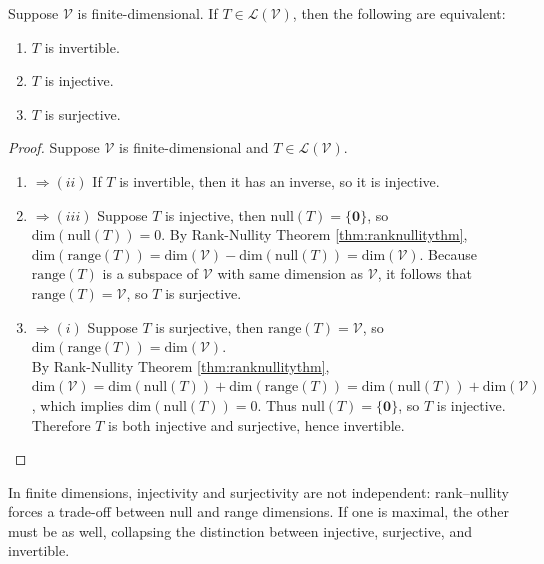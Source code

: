 \begin{theorem} Suppose $\mathcal{V}$ is finite-dimensional. If $T \in \mathcal{L}(\mathcal{V})$, then the following are equivalent:
\begin{enumerate}[label=\roman*.]
\setlength{\itemsep}{0pt}
\item $T$ is invertible.
\item $T$ is injective.
\item $T$ is surjective.
\end{enumerate}
\begin{proof} Suppose $\mathcal{V}$ is finite-dimensional and $T \in \mathcal{L}(\mathcal{V})$.
\begin{enumerate}[label=\roman*.]
\setlength{\itemsep}{0pt}
\item[$(i)$]$\Rightarrow (ii)$ If $T$ is invertible, then it has an inverse, so it is injective.
\item[$(ii)$]$\Rightarrow (iii)$ Suppose $T$ is injective, then $\text{null}(T) = \{\mathbf{0} \}$, so $\text{dim}(\text{null}(T)) = 0$. By Rank-Nullity Theorem \ref{thm:ranknullitythm}, $\text{dim}(\text{range}(T)) = \text{dim}(\mathcal{V}) - \text{dim}(\text{null}(T)) = \text{dim}(\mathcal{V})$. Because $\text{range}(T)$ is a subspace of $\mathcal{V}$ with same dimension as $\mathcal{V}$, it follows that $\text{range}(T) = \mathcal{V}$, so $T$ is surjective.
\item[$(iii)$]$\Rightarrow (i)$ Suppose $T$ is surjective, then $\text{range}(T) = \mathcal{V}$, so $\text{dim}(\text{range}(T)) = \text{dim}(\mathcal{V})$.\\
By Rank-Nullity Theorem \ref{thm:ranknullitythm}, $\text{dim}(\mathcal{V}) = \text{dim}(\text{null}(T)) + \text{dim}(\text{range}(T)) = \text{dim}(\text{null}(T)) +\text{dim}(\mathcal{V})$, which implies $\text{dim}(\text{null}(T)) = 0$. Thus $\text{null}(T) = \{ \mathbf{0} \}$, so $T$ is injective.\\
Therefore $T$ is both injective and surjective, hence invertible.
\end{enumerate}
\end{proof}
\end{theorem}

In finite dimensions, injectivity and surjectivity are not independent: rank–nullity forces a trade-off between null and range dimensions. If one is maximal, the other must be as well, collapsing the distinction between injective, surjective, and invertible.

